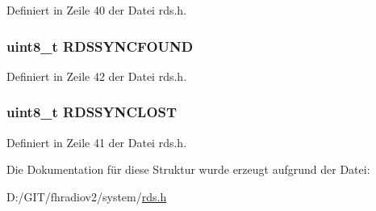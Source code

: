 Definiert in Zeile 40 der Datei rds.\+h.

\hypertarget{structinfo_a924e0044d60c0d490d165ceb3ef6b23d}{}
\subsubsection[{R\+D\+S\+S\+Y\+N\+C\+F\+O\+U\+N\+D}]{\setlength{\rightskip}{0pt plus 5cm}uint8\+\_\+t R\+D\+S\+S\+Y\+N\+C\+F\+O\+U\+N\+D}\label{structinfo_a924e0044d60c0d490d165ceb3ef6b23d}


Definiert in Zeile 42 der Datei rds.\+h.

\hypertarget{structinfo_a73c3d34273c45dd08fcb341496c08052}{}
\subsubsection[{R\+D\+S\+S\+Y\+N\+C\+L\+O\+S\+T}]{\setlength{\rightskip}{0pt plus 5cm}uint8\+\_\+t R\+D\+S\+S\+Y\+N\+C\+L\+O\+S\+T}\label{structinfo_a73c3d34273c45dd08fcb341496c08052}


Definiert in Zeile 41 der Datei rds.\+h.



Die Dokumentation für diese Struktur wurde erzeugt aufgrund der Datei\+:\begin{DoxyCompactItemize}
\item 
D\+:/\+G\+I\+T/fhradiov2/system/\hyperlink{rds_8h}{rds.\+h}\end{DoxyCompactItemize}
